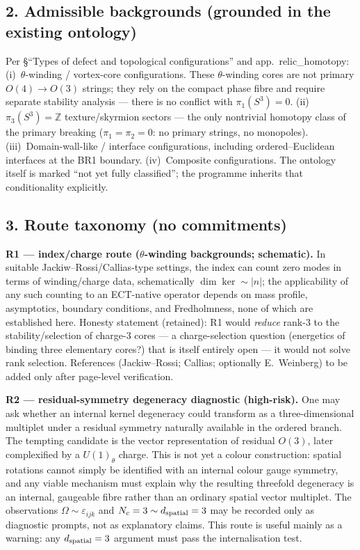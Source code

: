 \subsection*{2. Admissible backgrounds (grounded in the existing
ontology)}
Per \S ``Types of defect and topological configurations'' and
app.~relic\_homotopy:
(i)~$\theta$-winding / vortex-core configurations.
These $\theta$-winding cores are not primary $O(4)\to O(3)$
strings; they rely on the compact phase fibre and require separate
stability analysis --- there is no conflict with
$\pi_1(S^3)=0$.
(ii)~$\pi_3(S^3)=\mathbb Z$ texture/skyrmion sectors --- the only
nontrivial homotopy class of the primary breaking
($\pi_1=\pi_2=0$: no primary strings, no monopoles).
(iii)~Domain-wall-like / interface configurations, including
ordered--Euclidean interfaces at the BR1 boundary.
(iv)~Composite configurations.
The ontology itself is marked ``not yet fully classified''; the
programme inherits that conditionality explicitly.

\subsection*{3. Route taxonomy (no commitments)}
\textbf{R1 --- index/charge route ($\theta$-winding backgrounds;
schematic).}
In suitable Jackiw--Rossi/Callias-type settings, the index can
count zero modes in terms of winding/charge data, schematically
$\dim\ker\sim|n|$; the applicability of any such counting to an
ECT-native operator depends on mass profile, asymptotics, boundary
conditions, and Fredholmness, none of which are established here.
Honesty statement (retained): R1 would \emph{reduce} rank-3 to the
stability/selection of charge-3 cores --- a charge-selection
question (energetics of binding three elementary cores?) that is
itself entirely open --- it would not solve rank selection.
References (Jackiw--Rossi; Callias; optionally E.~Weinberg) to be
added only after page-level verification.

\textbf{R2 --- residual-symmetry degeneracy diagnostic
(high-risk).}
One may ask whether an internal kernel degeneracy could transform
as a three-dimensional multiplet under a residual symmetry
naturally available in the ordered branch.  The tempting candidate
is the vector representation of residual $O(3)$, later
complexified by a $U(1)_\theta$ charge.  This is not yet a colour
construction: spatial rotations cannot simply be identified with
an internal colour gauge symmetry, and any viable mechanism must
explain why the resulting threefold degeneracy is an internal,
gaugeable fibre rather than an ordinary spatial vector multiplet.
The observations $\Omega\sim\varepsilon_{ijk}$ and
$N_c=3\sim d_{\rm spatial}=3$ may be recorded only as diagnostic
prompts, not as explanatory claims.
This route is useful mainly as a warning: any
$d_{\rm spatial}=3$ argument must pass the internalisation test.

